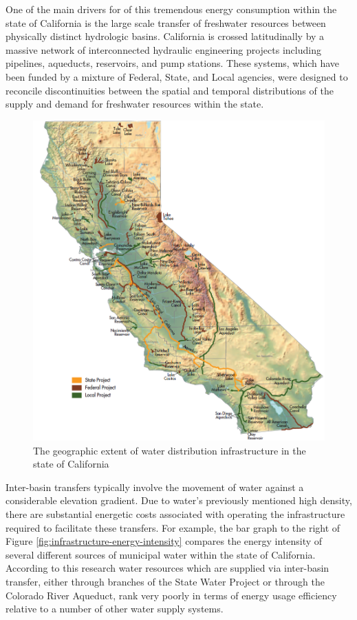 One of the main drivers for of this tremendous energy consumption within the state of California is the large scale transfer of freshwater resources between physically distinct hydrologic basins. California is crossed latitudinally by a massive network of interconnected hydraulic engineering projects including pipelines, aqueducts, reservoirs, and pump stations. These systems, which have been funded by a mixture of Federal, State, and Local agencies, were designed to reconcile discontinuities between the spatial and temporal distributions of the supply and demand for freshwater resources within the state.

       \begin{figure}[!h]
       \centering
       \includegraphics[width=5.5in]{figures/infrastructure.png}
       \caption[Characteristics of Water Distribution Infrastructure]{The geographic extent of water distribution infrastructure in the state of California}
       \label{fig:california-distribution}
     \end{figure}
    
Inter-basin transfers typically involve the movement of water against a considerable elevation gradient. Due to water's previously mentioned high density, there are substantial energetic costs associated with operating the infrastructure required to facilitate these transfers. For example, the bar graph to the right of Figure \ref{fig:infrastructure-energy-intensity} compares the energy intensity of several different sources of municipal water within the state of California. According to this research water resources which are supplied via inter-basin transfer, either through branches of the State Water Project or through the Colorado River Aqueduct, rank very poorly in terms of energy usage efficiency relative to a number of other water supply systems.

